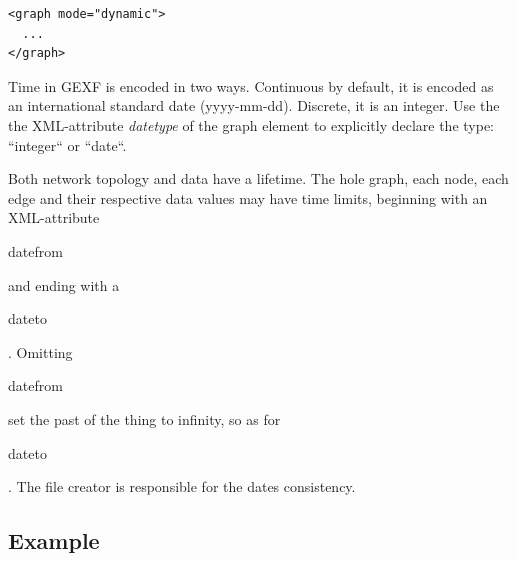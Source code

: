 \documentclass[a4paper,10pt]{article}
\begin{document}
\lstset{ style=gexf }
\begin{lstlisting}[caption={Dynamic Enabled!},label=dynamicEnabled]
<graph mode="dynamic">
  ...
</graph>
\end{lstlisting}

Time in GEXF is encoded in two ways. Continuous by default, it is encoded as an international standard date (yyyy-mm-dd). Discrete, it is an integer. Use the the XML-attribute \textit{datetype} of the graph element to explicitly declare the type: “integer“ or “date“.

Both network topology and data have a lifetime. The hole graph, each node, each edge and their respective data values may have time limits, beginning with an XML-attribute \begin{footnotesize}datefrom\end{footnotesize} and ending with a \begin{footnotesize}dateto\end{footnotesize}. Omitting \begin{footnotesize}datefrom\end{footnotesize} set the past of the thing to infinity, so as for \begin{footnotesize}dateto\end{footnotesize}. The file creator is responsible for the dates consistency.

\subsection{Example}
\end{document}
